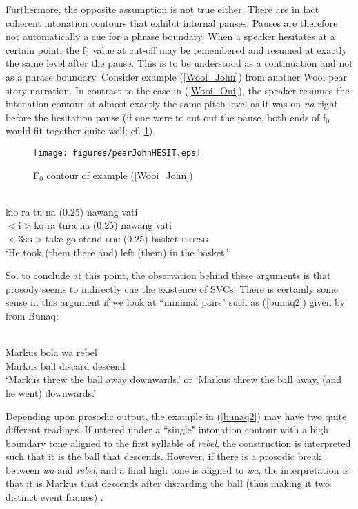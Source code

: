 Furthermore, the opposite assumption is not true either. There are in fact coherent intonation contours that exhibit internal pauses. Pauses are therefore not automatically a cue for a phrase boundary. When a speaker hesitates at a certain point, the f$_0$ value at cut-off may be remembered and resumed at exactly the same level after the pause. This is to be understood as a continuation and not as a phrase boundary. Consider example (\ref{Wooi_John}) from another Wooi pear story narration. In contrast to the case in (\ref{Wooi_Oni}), the speaker resumes the intonation contour at almost exactly the same pitch level as it was on \textit{na} right before the hesitation pause (if one were to cut out the pause, both ends of f$_0$ would fit together quite well; cf. \ref{fig:Wooi_John}).

\begin{figure}
\texttt{[image: figures/pearJohnHESIT.eps]} 
\caption{F$_0$ contour of example (\ref{Wooi_John})}\label{fig:Wooi_John}
\end{figure}

\ea \label{Wooi_John}
\\
\glll kio ra tu na (0.25) nawang vati \\
$<$i$>$ko ra tura na (0.25) nawang vati \\
$<$3\textsc{sg}$>$take go stand \textsc{loc} (0.25) basket \textsc{det}:\textsc{sg} \\
\glft `He took (them there and) left (them) in the basket.' \\ 
\z

So, to conclude at this point, the observation behind these arguments is that prosody seems to indirectly cue the existence of SVCs. There is certainly some sense in this argument if we look at ``minimal pairs" such as (\ref{bunaq2}) given by \citet{schapper2009bunaq} from Bunaq:

\ea \label{bunaq2} 
\\
\gll Markus bola wa rebel \\
Markus ball discard descend \\
\glft `Markus threw the ball away downwards.’ or `Markus threw the ball away, (and he went) downwards.’\\ 
\z

Depending upon prosodic output, the example in (\ref{bunaq2}) may have two quite different readings. If uttered under a ``single" intonation contour with a high boundary tone aligned to the first syllable of \textit{rebel}, the construction is interpreted such that it is the ball that descends. However, if there is a prosodic break between \textit{wa} and \textit{rebel}, and a final high tone is aligned to \textit{wa}, the interpretation is that it is Markus that descends after discarding the ball (thus making it two distinct event frames) \citep[442]{schapper2009bunaq}.

